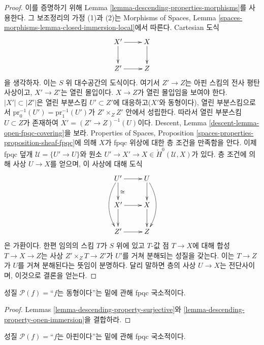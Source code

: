 \begin{proof}
이를 증명하기 위해 Lemma \ref{lemma-descending-properties-morphisms}를
사용한다. 그 보조정리의 가정 (1)과 (2)는 Morphisms of Spaces, Lemma
\ref{spaces-morphisms-lemma-closed-immersion-local}에서 따른다. Cartesian 도식
$$
\xymatrix{
X' \ar[r] \ar[d] & X \ar[d] \\
Z' \ar[r] & Z
}
$$
을 생각하자. 이는 $S$ 위 대수공간의 도식이다. 여기서 $Z'\to Z$는
아핀 스킴의 전사 평탄 사상이고,
$X'\to Z'$는 열린 몰입이다. $X\to Z$가 열린 몰입임을 보여야 한다.
$|X'|\subset|Z'|$은 열린 부분스킴 $U'\subset Z'$에 대응하고($X'$와
동형이다), 열린 부분스킴으로서
$\text{pr}_0^{-1}(U')=\text{pr}_1^{-1}(U')$가
$Z'\times_ZZ'$ 안에서 성립한다. 따라서 열린 부분스킴 $U\subset Z$가
존재하여 $X'=(Z'\to Z)^{-1}(U)$이다. Descent, Lemma
\ref{descent-lemma-open-fpqc-covering}을 보라. Properties of Spaces,
Proposition \ref{spaces-properties-proposition-sheaf-fpqc}에 의해 $X$가
fpqc 위상에 대한 층 조건을 만족함을 안다. 이제 fpqc 덮개
$\mathcal{U}=\{U'\to U\}$와 원소
$U'\to X'\to X\in\check{H}^0(\mathcal{U},X)$가 있다. 층 조건에 의해
사상 $U\to X$를 얻으며, 이 사상에 대해 도식
$$
\xymatrix{
U' \ar[r] \ar[d]^{\cong} \ar@/_3ex/[dd] & U \ar[d] \ar@/^3ex/[dd] \\
X' \ar[r] \ar[d] & X \ar[d] \\
Z' \ar[r] & Z
}
$$
은 가환이다. 한편 임의의 스킴 $T$가 $S$ 위에 있고 $T$-값 점
$T\to X$에 대해 합성 $T\to X\to Z$는 사상
$Z'\times_ZT\to Z'$가 $U'$를 거쳐 분해되는 성질을 갖는다. 이는
$T\to Z$가 $U$를 거쳐 분해된다는 뜻임이 분명하다. 달리 말하면 층의
사상 $U\to X$는 전단사이며, 이것으로 결론을 얻는다.
\end{proof}

\begin{lemma}
\label{lemma-descending-property-isomorphism}
성질 $\mathcal{P}(f)=$``$f$는 동형이다''는 밑에 관해 fpqc 국소적이다.
\end{lemma}

\begin{proof}
Lemmas \ref{lemma-descending-property-surjective}와
\ref{lemma-descending-property-open-immersion}을 결합하라.
\end{proof}

\begin{lemma}
\label{lemma-descending-property-affine}
성질 $\mathcal{P}(f)=$``$f$는 아핀이다''는 밑에 관해 fpqc 국소적이다.
\end{lemma}


